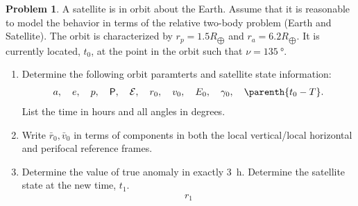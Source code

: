 \documentclass[10pt]{article}
\theoremstyle{definition}
\newtheorem{prob}{Problem}[section]
\newenvironment{subprob}%
{\renewcommand{\theenumi}{\alph{enumi}}\renewcommand{\labelenumi}{(\theenumi)}\begin{enumerate}}%
{\end{enumerate}}%
\begin{document}
\begin{prob}
    A satellite is in orbit about the Earth. 
    Assume that it is reasonable to model the behavior in terms of the relative two-body problem (Earth and Satellite).
    The orbit is characterized by \( r_p = 1.5 R_{\bigoplus} \) and \( r_a = 6.2 R_{\bigoplus} \).
    It is currently located, \( t_0 \), at the point in the orbit such that \( \nu = \SI{135}{\degree} \).

    \begin{subprob}
        \item Determine the following orbit paramterts and satellite state information:
            \begin{align*}
                a, \quad e, \quad p, \quad \mathsf{P}, \quad \mathcal{E}, \quad r_0, \quad v_0, \quad E_0, \quad \gamma_0, \quad \parenth{t_0 - T}.
            \end{align*}
            List the time in hours and all angles in degrees.
        \item Write \( \bar r_0, \bar v_0 \) in terms of components in both the local vertical/local horizontal and perifocal reference frames.
        \item Determine the value of true anomaly in exactly \SI{3}{\hour}.
            Determine the satellite state at the new time, \( t_1 \).
            \begin{align*}
                r_1
            \end{align*}
    \end{subprob}
\end{prob}
\end{document}
